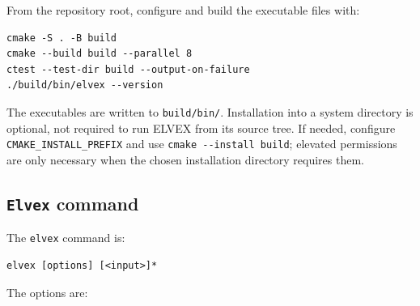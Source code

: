 \documentclass[11pt]{article}
\begin{document}
From the repository root, configure and build the executable files with:

\begin{lstlisting}[frame=none, numbers=none]
cmake -S . -B build
cmake --build build --parallel 8
ctest --test-dir build --output-on-failure
./build/bin/elvex --version
\end{lstlisting}

The executables are written to \texttt{build/bin/}. Installation into a
system directory is optional, not required to run ELVEX from its source tree.
If needed, configure \texttt{CMAKE\_INSTALL\_PREFIX} and use
\verb#cmake --install build#; elevated permissions are only necessary when
the chosen installation directory requires them.

\subsection{\texttt{Elvex} command}

The \texttt{elvex} command is:

\begin{lstlisting}[frame=none, numbers=none]
elvex [options] [<input>]*
\end{lstlisting}

The options are:
\end{document}
